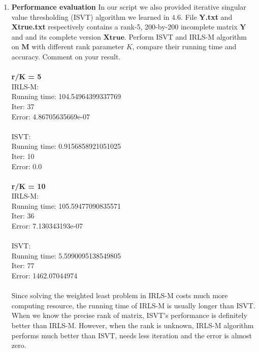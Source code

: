 \documentclass[12pt]{article}
\begin{document}
\begin{enumerate}
    \item \textbf{Performance evaluation} In our script we also provided iterative singular value thresholding (ISVT) algorithm we learned in $4.6$. File \textbf{Y.txt} and \textbf{Xtrue.txt} respectively contains a rank-5, 200-by-200 incomplete matrix $\boldsymbol{Y}$ and and its complete version $\boldsymbol{Xtrue}$. Perform ISVT and IRLS-M algorithm on $\boldsymbol{M}$ with different rank parameter $K$, compare their running time and accuracy. Comment on your result.\\
    \\
    \textbf{r/K = 5}\\
    IRLS-M:\\
    Running time: 104.54964399337769\\
    Iter: 37\\
    Error: 4.86705635669e-07\\
    \\
    ISVT:\\
    Running time: 0.9156858921051025\\
    Iter: 10\\
    Error: 0.0\\
    \\
    \textbf{r/K = 10}\\
    IRLS-M:\\
    Running time: 105.59477090835571\\
    Iter: 36\\
    Error: 7.130343193e-07\\
    \\
    ISVT:\\
    Running time: 5.5990095138549805\\
    Iter: 77\\
    Error: 1462.07044974\\
    \\
    Since solving the weighted least problem in IRLS-M costs much more computing resource, the running time of IRLS-M is usually longer than ISVT.  
    When we know the precise rank of matrix, ISVT's performance is definitely better than IRLS-M. However, when the rank is unknown, IRLS-M algorithm performs much better than ISVT, needs less iteration and the error is almost zero.
\end{enumerate}
\end{document}
